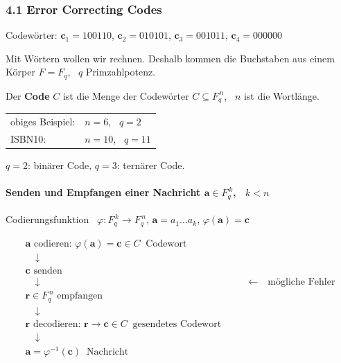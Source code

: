 \subsubsection*{4.1 Error Correcting Codes}


\begin{beispiel}
Codewörter: \quad $\mathbf{c}_1 = 100110$, $\mathbf{c}_2 = 010101$, $\mathbf{c}_3 = 001011$, $\mathbf{c}_4 = 000000$
\end{beispiel}

Mit Wörtern wollen wir rechnen. Deshalb kommen die Buchstaben aus einem Körper $F = F_q$, \ $q$ Primzahlpotenz.

\begin{definition}[Code]
Der \textbf{Code} $C$ ist die Menge der Codewörter $C \subseteq F_q^{\,n}$, \ $n$ ist die Wortlänge.
\end{definition}

\begin{tabular}{ll}
obiges Beispiel: & $n = 6$, \ $q = 2$ \\
ISBN10: & $n = 10$, \ $q = 11$ \\
\end{tabular}

$q = 2$: binärer Code, \quad $q = 3$: ternärer Code.

\paragraph{Senden und Empfangen einer Nachricht $\mathbf{a} \in F_q^{\,k}$, \ $k < n$}
Codierungsfunktion \ $\varphi : F_q^{\,k} \to F_q^{\,n}$, \quad $\mathbf{a} = a_1 \dots a_k$, \quad $\varphi(\mathbf{a}) = \mathbf{c}$

\[
\begin{array}{ll}
\mathbf{a} \text{ codieren: } \varphi(\mathbf{a}) = \mathbf{c} \in C \ \text{ Codewort} & \\
\quad\downarrow & \\
\mathbf{c} \text{ senden} & \\
\quad\downarrow & \qquad\leftarrow \quad \text{mögliche Fehler} \\
\mathbf{r} \in F_q^{\,n} \text{ empfangen} & \\
\quad\downarrow & \\
\mathbf{r} \text{ decodieren: } \mathbf{r} \to \mathbf{c} \in C \ \text{ gesendetes Codewort} & \\
\quad\downarrow & \\
\mathbf{a} = \varphi^{-1}(\mathbf{c}) \ \text{ Nachricht} &
\end{array}
\]


